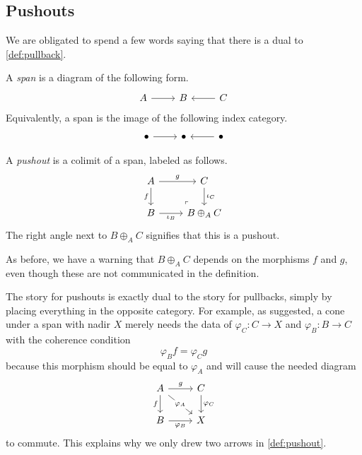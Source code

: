 \documentclass[../notes.tex]{subfiles}
\begin{document}
\subsection{Pushouts}
We are obligated to spend a few words saying that there is a dual to \autoref{def:pullback}.
\begin{definition}[Span]
	A \textit{span} is a diagram of the following form.
	\[\begin{tikzcd}
		A & B & C
		\arrow[from=1-3, to=1-2]
		\arrow[from=1-1, to=1-2]
	\end{tikzcd}\]
	Equivalently, a span is the image of the following index category.
	\[\begin{tikzcd}
		\bullet & \bullet & \bullet
		\arrow[from=1-1, to=1-2]
		\arrow[from=1-3, to=1-2]
	\end{tikzcd}\]
\end{definition}
\begin{definition} \label{def:pushout}
	A \textit{pushout} is a colimit of a span, labeled as follows.
	\[\begin{tikzcd}
		A & C \\
		B & {B\oplus_AC}
		\arrow["f"', from=1-1, to=2-1]
		\arrow["g", from=1-1, to=1-2]
		\arrow["{\iota_C}", from=1-2, to=2-2]
		\arrow["{\iota_B}"', from=2-1, to=2-2]
		\arrow["\lrcorner"{anchor=center, pos=0.125, rotate=180}, draw=none, from=2-2, to=1-1]
	\end{tikzcd}\]
	The right angle next to $B\oplus_AC$ signifies that this is a pushout.
\end{definition}
As before, we have a warning that $B\oplus_AC$ depends on the morphisms $f$ and $g$, even though these are not communicated in the definition.

The story for pushouts is exactly dual to the story for pullbacks, simply by placing everything in the opposite category. For example, as suggested, a cone under a span with nadir $X$ merely needs the data of $\varphi_C:C\to X$ and $\varphi_B:B\to C$ with the coherence condition
\[\varphi_Bf=\varphi_Cg\]
because this morphism should be equal to $\varphi_A$ and will cause the needed diagram
\[\begin{tikzcd}
	A & C \\
	B & X
	\arrow["f"', from=1-1, to=2-1]
	\arrow["g", from=1-1, to=1-2]
	\arrow["{\varphi_C}", from=1-2, to=2-2]
	\arrow["{\varphi_B}"', from=2-1, to=2-2]
	\arrow["{\varphi_A}"{description}, from=1-1, to=2-2]
\end{tikzcd}\]
to commute. This explains why we only drew two arrows in \autoref{def:pushout}.
\end{document}
